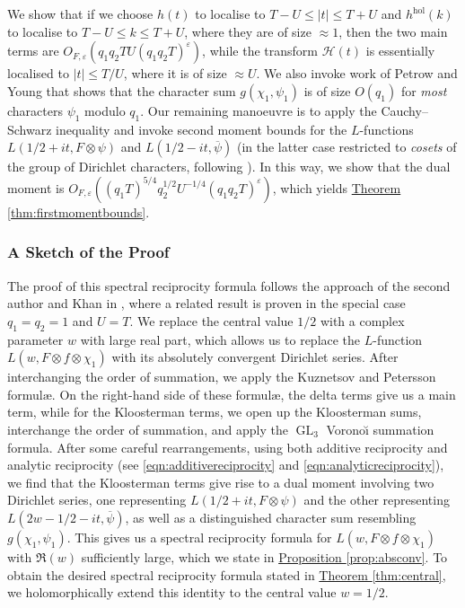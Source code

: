 \documentclass[11pt,a4paper]{amsart}
\newcommand{\e}{\varepsilon}
\newcommand{\HH}{\mathcal{H}}
\newcommand{\hol}{\mathrm{hol}}
\DeclareMathOperator{\GL}{GL}
\numberwithin{equation}{section}
\theoremstyle{remark}
\theoremstyle{definition}
\begin{document}
We show that if we choose $h(t)$ to localise to $T - U \leq |t| \leq T + U$ and $h^{\hol}(k)$ to localise to $T - U \leq k \leq T + U$, where they are of size $\approx 1$, then the two main terms are $O_{F,\e} (q_1 q_2 TU (q_1 q_2 T)^{\e})$, while the transform $\HH(t)$ is essentially localised to $|t| \leq T/U$, where it is of size $\approx U$. We also invoke work of Petrow and Young \cite{PY20,PY23} that shows that the character sum $g(\chi_1,\psi_1)$ is of size $O(q_1)$ for \emph{most} characters $\psi_1$ modulo $q_1$. Our remaining manoeuvre is to apply the Cauchy--Schwarz inequality and invoke second moment bounds for the $L$-functions $L(1/2 + it,F \otimes \psi)$ and $L(1/2 - it,\overline{\psi})$ (in the latter case restricted to \emph{cosets} of the group of Dirichlet characters, following \cite{PY23}). In this way, we show that the dual moment is $O_{F,\e}((q_1 T)^{5/4} q_2^{1/2} U^{-1/4} (q_1 q_2 T)^{\e})$, which yields \hyperref[thm:firstmomentbounds]{Theorem \ref*{thm:firstmomentbounds}}.


\subsubsection{A Sketch of the Proof}

The proof of this spectral reciprocity formula follows the approach of the second author and Khan in \cite{HK25}, where a related result is proven in the special case $q_1 = q_2 = 1$ and $U = T$. We replace the central value $1/2$ with a complex parameter $w$ with large real part, which allows us to replace the $L$-function $L(w,F \otimes f \otimes \chi_1)$ with its absolutely convergent Dirichlet series. After interchanging the order of summation, we apply the Kuznetsov and Petersson formul\ae{}. On the right-hand side of these formul\ae{}, the delta terms give us a main term, while for the Kloosterman terms, we open up the Kloosterman sums, interchange the order of summation, and apply the $\GL_3$ Vorono\u{\i} summation formula. After some careful rearrangements, using both additive reciprocity and analytic reciprocity (see \eqref{eqn:additivereciprocity} and \eqref{eqn:analyticreciprocity}), we find that the Kloosterman terms give rise to a dual moment involving two Dirichlet series, one representing $L(1/2 + it, F \otimes \psi)$ and the other representing $L(2w - 1/2 - it,\overline{\psi})$, as well as a distinguished character sum resembling $g(\chi_1,\psi_1)$. This gives us a spectral reciprocity formula for $L(w,F \otimes f \otimes \chi_1)$ with $\Re(w)$ sufficiently large, which we state in \hyperref[prop:absconv]{Proposition \ref*{prop:absconv}}. To obtain the desired spectral reciprocity formula stated in \hyperref[thm:central]{Theorem \ref*{thm:central}}, we holomorphically extend this identity to the central value $w = 1/2$.
\end{document}
